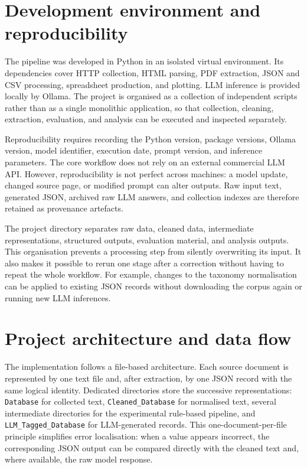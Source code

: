 \documentclass[
11pt,
english,
singlespacing,
headsepline,
]{MastersDoctoralThesis}
\begin{document}
\section{Development environment and reproducibility}

The pipeline was developed in Python in an isolated virtual environment. Its
dependencies cover HTTP collection, HTML parsing, PDF extraction, JSON and CSV
processing, spreadsheet production, and plotting. LLM inference is provided
locally by Ollama. The project is organised as a collection of independent
scripts rather than as a single monolithic application, so that collection,
cleaning, extraction, evaluation, and analysis can be executed and inspected
separately.

Reproducibility requires recording the Python version, package versions, Ollama
version, model identifier, execution date, prompt version, and inference
parameters. The core workflow does not rely on an external commercial LLM API.
However, reproducibility is not perfect across machines: a model update, changed
source page, or modified prompt can alter outputs. Raw input text, generated
JSON, archived raw LLM answers, and collection indexes are therefore retained as
provenance artefacts.

The project directory separates raw data, cleaned data, intermediate
representations, structured outputs, evaluation material, and analysis outputs.
This organisation prevents a processing step from silently overwriting its
input. It also makes it possible to rerun one stage after a correction without
having to repeat the whole workflow. For example, changes to the taxonomy
normalisation can be applied to existing JSON records without downloading the
corpus again or running new LLM inferences.

\section{Project architecture and data flow}

The implementation follows a file-based architecture. Each source document is
represented by one text file and, after extraction, by one JSON record with the
same logical identity. Dedicated directories store the successive
representations: \texttt{Database} for collected text, \texttt{Cleaned\_Database}
for normalised text, several intermediate directories for the experimental
rule-based pipeline, and \texttt{LLM\_Tagged\_Database} for LLM-generated
records. This one-document-per-file principle simplifies error localisation:
when a value appears incorrect, the corresponding JSON output can be compared
directly with the cleaned text and, where available, the raw model response.
\end{document}
